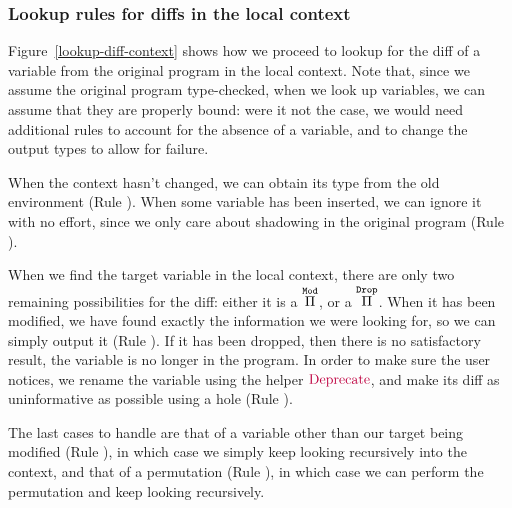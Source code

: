 \subsubsection{Lookup rules for diffs in the local context}

Figure~\ref{lookup-diff-context} shows how we proceed to lookup for the diff of
a variable from the original program in the local context.  Note that, since we
assume the original program type-checked, when we look up variables, we can
assume that they are properly bound: were it not the case, we would need
additional rules to account for the absence of a variable, and to change the
output types to allow for failure.

When the context hasn't changed, we can obtain its type from the old environment
(Rule ).  When some variable has been inserted, we can
ignore it with no effort, since we only care about shadowing in the original
program (Rule ).

When we find the target variable in the local context, there are only two
remaining possibilities for the diff: either it is a $\overset{\mathtt{Mod}}{\Pi}$, or a
$\overset{\mathtt{Drop}}{\Pi}$.  When it has been modified, we have found exactly the
information we were looking for, so we can simply output it
(Rule ).  If it has been dropped, then there is no
satisfactory result, the variable is no longer in the program.  In order to make
sure the user notices, we rename the variable using the helper
$\textcolor{purple}{\text{Deprecate}}$, and make its diff as uninformative as possible using a
hole (Rule ).

The last cases to handle are that of a variable other than our target being
modified (Rule ), in which case we simply keep looking
recursively into the context, and that of a permutation
(Rule ), in which case we can perform the permutation
and keep looking recursively.

